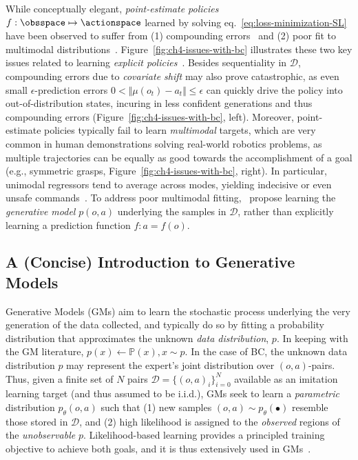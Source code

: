 While conceptually elegant, \emph{point-estimate policies} \( f : \obsspace \mapsto \actionspace \) learned by solving eq.~\ref{eq:loss-minimization-SL} have been observed to suffer from (1) compounding errors~\citep{rossReductionImitationLearning2011} and (2) poor fit to multimodal distributions~\citep{florenceImplicitBehavioralCloning2022, keGraspingChopsticksCombating2020}.
Figure~\ref{fig:ch4-issues-with-bc} illustrates these two key issues related to learning \emph{explicit policies}~\citep{florenceImplicitBehavioralCloning2022}.
Besides sequentiality in \( \mathcal D \), compounding errors due to \emph{covariate shift} may also prove catastrophic, as even small \( \epsilon \)-prediction errors \( 0 < \Vert \mu(o_t) - a_t \Vert \leq \epsilon \) can quickly drive the policy into out-of-distribution states, incuring in less confident generations and thus compounding errors (Figure~\ref{fig:ch4-issues-with-bc}, left).
Moreover, point-estimate policies typically fail to learn \emph{multimodal} targets, which are very common in human demonstrations solving real-world robotics problems, as multiple trajectories can be equally as good towards the accomplishment of a goal (e.g., symmetric grasps, Figure~\ref{fig:ch4-issues-with-bc}, right).
In particular, unimodal regressors tend to average across modes, yielding indecisive or even unsafe commands~\citep{florenceImplicitBehavioralCloning2022}.
To address poor multimodal fitting,~\citet{florenceImplicitBehavioralCloning2022} propose learning the \emph{generative model} \( p(o, a) \) underlying the samples in \( \mathcal D \), rather than explicitly learning a prediction function \( f: a = f(o) \).

\subsection{A (Concise) Introduction to Generative Models}
Generative Models (GMs) aim to learn the stochastic process underlying the very generation of the data collected, and typically do so by fitting a probability distribution that approximates the unknown \emph{data distribution}, \( p \).
In keeping with the GM literature, \( p(x) \leftarrow \mathbb P(x), x \sim p \).
In the case of BC, the unknown data distribution \( p \) may represent the expert's joint distribution over \( (o, a) \)-pairs.
Thus, given a finite set of \( N \) pairs \(\mathcal D = \{ (o,a)_i \}_{i=0}^N\) available as an imitation learning target (and thus assumed to be i.i.d.), GMs seek to learn a \emph{parametric} distribution \( p_\theta(o,a) \) such that (1) new samples \( (o,a) \sim p_\theta(\bullet) \) resemble those stored in \( \mathcal D \), and (2) high likelihood is assigned to the \emph{observed} regions of the \emph{unobservable} \( p \).
Likelihood-based learning provides a principled training objective to achieve both goals, and it is thus extensively used in GMs~\citep{prince2023understanding}.

